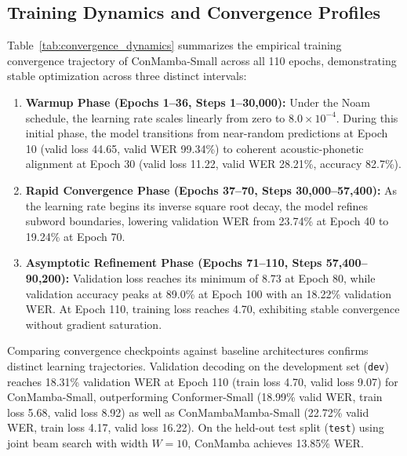 \documentclass[journal]{IEEEtran}
\begin{document}
\subsection{Training Dynamics and Convergence Profiles}
\label{sec:convergence}
Table~\ref{tab:convergence_dynamics} summarizes the empirical training convergence trajectory of ConMamba-Small across all 110 epochs, demonstrating stable optimization across three distinct intervals:
\begin{enumerate}
    \item \textbf{Warmup Phase (Epochs 1--36, Steps 1--30,000):} Under the Noam schedule, the learning rate scales linearly from zero to $8.0 \times 10^{-4}$. During this initial phase, the model transitions from near-random predictions at Epoch 10 (valid loss 44.65, valid WER 99.34\%) to coherent acoustic-phonetic alignment at Epoch 30 (valid loss 11.22, valid WER 28.21\%, accuracy 82.7\%).
    \item \textbf{Rapid Convergence Phase (Epochs 37--70, Steps 30,000--57,400):} As the learning rate begins its inverse square root decay, the model refines subword boundaries, lowering validation WER from 23.74\% at Epoch 40 to 19.24\% at Epoch 70.
    \item \textbf{Asymptotic Refinement Phase (Epochs 71--110, Steps 57,400--90,200):} Validation loss reaches its minimum of 8.73 at Epoch 80, while validation accuracy peaks at 89.0\% at Epoch 100 with an 18.22\% validation WER. At Epoch 110, training loss reaches 4.70, exhibiting stable convergence without gradient saturation.
\end{enumerate}

Comparing convergence checkpoints against baseline architectures confirms distinct learning trajectories. Validation decoding on the development set (\texttt{dev}) reaches 18.31\% validation WER at Epoch 110 (train loss 4.70, valid loss 9.07) for ConMamba-Small, outperforming Conformer-Small (18.99\% valid WER, train loss 5.68, valid loss 8.92) as well as ConMambaMamba-Small (22.72\% valid WER, train loss 4.17, valid loss 16.22). On the held-out test split (\texttt{test}) using joint beam search with width $W=10$, ConMamba achieves 13.85\% WER.
\end{document}
